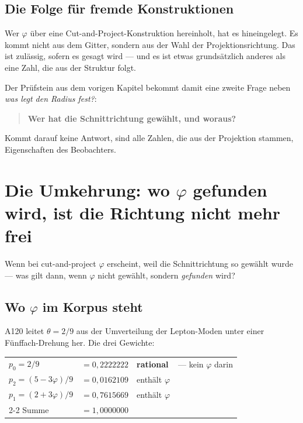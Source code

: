 \section{Die Folge für fremde Konstruktionen}

Wer $\varphi$ über eine Cut-and-Project-Konstruktion hereinholt, hat es
hineingelegt. Es kommt nicht aus dem Gitter, sondern aus der Wahl der
Projektionsrichtung. Das ist zulässig, sofern es gesagt wird --- und es
ist etwas grundsätzlich anderes als eine Zahl, die aus der Struktur
folgt.

Der Prüfstein aus dem vorigen Kapitel bekommt damit eine zweite Frage
neben \emph{was legt den Radius fest?}:

\begin{quote}
\textbf{Wer hat die Schnittrichtung gewählt, und woraus?}
\end{quote}

Kommt darauf keine Antwort, sind alle Zahlen, die aus der Projektion
stammen, Eigenschaften des Beobachters.

\chapter{Die Umkehrung: wo \texorpdfstring{$\varphi$}{phi} gefunden
wird, ist die Richtung nicht mehr frei}

Wenn bei cut-and-project $\varphi$ erscheint, weil die Schnittrichtung
so gewählt wurde --- was gilt dann, wenn $\varphi$ nicht gewählt,
sondern \emph{gefunden} wird?

\section{Wo \texorpdfstring{$\varphi$}{phi} im Korpus steht}

A120 leitet $\theta = 2/9$ aus der Umverteilung der Lepton-Moden unter
einer Fünffach-Drehung her. Die drei Gewichte:
\begin{center}
\begin{tabular}{llll}
$p_0 = 2/9$ & $= 0{,}2222222$ & \textbf{rational} & --- kein $\varphi$ darin \\
$p_2 = (5 - 3\varphi)/9$ & $= 0{,}0162109$ & enthält $\varphi$ & \\
$p_1 = (2 + 3\varphi)/9$ & $= 0{,}7615669$ & enthält $\varphi$ & \\
\cmidrule{2-2}
Summe & $= 1{,}0000000$ & & \\
\end{tabular}
\end{center}

